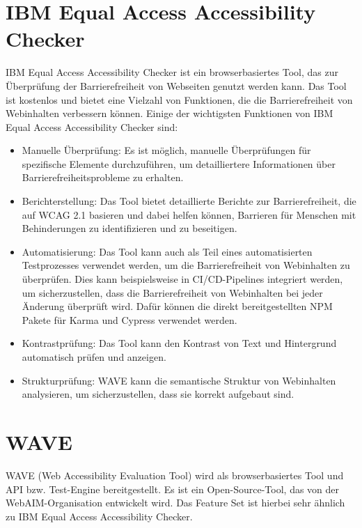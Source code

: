 \section{IBM Equal Access Accessibility Checker}
\label{sec:a11yToolsIBMEAAC}

IBM Equal Access Accessibility Checker ist ein browserbasiertes Tool, das zur Überprüfung der Barrierefreiheit von Webseiten genutzt werden kann. Das Tool ist kostenlos und bietet eine Vielzahl von Funktionen, die die Barrierefreiheit von Webinhalten verbessern können. Einige der wichtigsten Funktionen von IBM Equal Access Accessibility Checker sind:

\begin{itemize}
    \item Manuelle Überprüfung: Es ist möglich, manuelle Überprüfungen für spezifische Elemente durchzuführen, um detailliertere Informationen über Barrierefreiheitsprobleme zu erhalten.
    \item Berichterstellung: Das Tool bietet detaillierte Berichte zur Barrierefreiheit, die auf WCAG 2.1 basieren und dabei helfen können, Barrieren für Menschen mit Behinderungen zu identifizieren und zu beseitigen.
    \item Automatisierung: Das Tool kann auch als Teil eines automatisierten Testprozesses verwendet werden, um die Barrierefreiheit von Webinhalten zu überprüfen. Dies kann beispielsweise in CI/CD-Pipelines integriert werden, um sicherzustellen, dass die Barrierefreiheit von Webinhalten bei jeder Änderung überprüft wird. Dafür können die direkt bereitgestellten NPM Pakete für Karma und Cypress verwendet werden.
    \item Kontrastprüfung: Das Tool kann den Kontrast von Text und Hintergrund automatisch prüfen und anzeigen.
    \item Strukturprüfung: WAVE kann die semantische Struktur von Webinhalten analysieren, um sicherzustellen, dass sie korrekt aufgebaut sind.
\end{itemize}

\section{WAVE}
\label{sec:a11yToolsWAVE}

WAVE (Web Accessibility Evaluation Tool) wird als browserbasiertes Tool und API bzw. Test-Engine bereitgestellt. Es ist ein Open-Source-Tool, das von der WebAIM-Organisation entwickelt wird. Das Feature Set ist hierbei sehr ähnlich zu IBM Equal Access Accessibility Checker.

